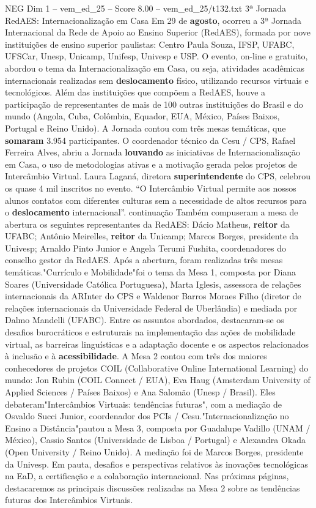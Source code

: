 \begin{textsample}{NEG Dim 1 – vem\_ed\_25 – Score 8.00 – vem\_ed\_25/t132.txt}  \label{ex:f1_neg_117}
3ª Jornada RedAES: Internacionalização em Casa Em 29 de \textbf{agosto}, ocorreu a 3ª Jornada Internacional da Rede de Apoio ao Ensino Superior (RedAES), formada por nove instituições de ensino superior paulistas: Centro Paula Souza, IFSP, UFABC, UFSCar, Unesp, Unicamp, Unifesp, Univesp e USP.
O evento, on-line e gratuito, abordou o tema da Internacionalização em Casa, ou seja, atividades acadêmicas internacionais realizadas sem \textbf{deslocamento} físico, utilizando recursos virtuais e tecnológicos.
Além das instituições que compõem a RedAES, houve a participação de representantes de mais de 100 outras instituições do Brasil e do mundo (Angola, Cuba, Colômbia, Equador, EUA, México, Países Baixos, Portugal e Reino Unido).
A Jornada contou com três mesas temáticas, que \textbf{somaram} 3.954 participantes.
O coordenador técnico da Cesu / CPS, Rafael Ferreira Alves, abriu a Jornada \textbf{louvando} as iniciativas de Internacionalização em Casa, o uso de metodologias ativas e a motivação gerada pelos projetos de Intercâmbio Virtual.
Laura Laganá, diretora \textbf{superintendente} do CPS, celebrou os quase 4 mil inscritos no evento. “O Intercâmbio Virtual permite aos nossos alunos contatos com diferentes culturas sem a necessidade de altos recursos para o \textbf{deslocamento} internacional”. continuação Também compuseram a mesa de abertura os seguintes representantes da RedAES: Dácio Matheus, \textbf{reitor} da UFABC; Antônio Meirelles, \textbf{reitor} da Unicamp; Marcos Borges, presidente da Univesp; Arnaldo Pinto Junior e Angela Terumi Fushita, coordenadores do conselho gestor da RedAES.
Após a abertura, foram realizadas três mesas temáticas."Currículo e Mobilidade"foi o tema da Mesa 1, composta por Diana Soares (Universidade Católica Portuguesa), Marta Iglesis, assessora de relações internacionais da ARInter do CPS e Waldenor Barros Moraes Filho (diretor de relações internacionais da Universidade Federal de Uberlândia) e mediada por Dalmo Mandelli (UFABC).
Entre os assuntos abordados, destacaram-se os desafios burocráticos e estruturais na implementação das ações de mobilidade virtual, as barreiras linguísticas e a adaptação docente e os aspectos relacionados à inclusão e à \textbf{acessibilidade}.
A Mesa 2 contou com três dos maiores conhecedores de projetos COIL (Collaborative Online International Learning) do mundo: Jon Rubin (COIL Connect / EUA), Eva Haug (Amsterdam University of Applied Sciences / Países Baixos) e Ana Salomão (Unesp / Brasil).
Eles debateram"Intercâmbios Virtuais: tendências futuras", com a mediação de Osvaldo Succi Junior, coordenador dos PCIs / Cesu."Internacionalização no Ensino a Distância"pautou a Mesa 3, composta por Guadalupe Vadillo (UNAM / México), Cassio Santos (Universidade de Lisboa / Portugal) e Alexandra Okada (Open University / Reino Unido).
A mediação foi de Marcos Borges, presidente da Univesp.
Em pauta, desafios e perspectivas relativos às inovações tecnológicas na EaD, a certificação e a colaboração internacional.
Nas próximas páginas, destacaremos as principais discussões realizadas na Mesa 2 sobre as tendências futuras dos Intercâmbios Virtuais.

\end{textsample}
